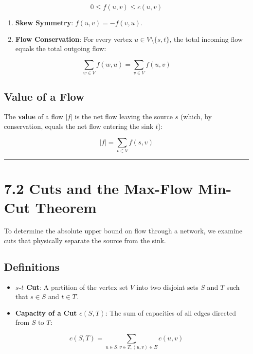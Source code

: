 \documentclass[
]{book}
\providecommand{\tightlist}{%
  \setlength{\itemsep}{0pt}\setlength{\parskip}{0pt}}
\theoremstyle{definition}
\theoremstyle{definition}
\theoremstyle{definition}
\theoremstyle{definition}
\theoremstyle{remark}
\begin{document}
\[0 \le f(u, v) \le c(u, v)\]

\begin{enumerate}
\def\labelenumi{\arabic{enumi}.}
\setcounter{enumi}{1}
\tightlist
\item
  \textbf{Skew Symmetry}: \(f(u, v) = -f(v, u)\).
\item
  \textbf{Flow Conservation}: For every vertex \(u \in V \setminus \{s, t\}\), the total incoming flow equals the total outgoing flow:
\end{enumerate}

\[\sum_{w \in V} f(w, u) = \sum_{v \in V} f(u, v)\]

\subsection{Value of a Flow}\label{value-of-a-flow}

The \textbf{value} of a flow \(\vert{}f\vert{}\) is the net flow leaving the source \(s\) (which, by conservation, equals the net flow entering the sink \(t\)):

\[\vert{}f\vert{} = \sum_{v \in V} f(s, v)\]

\begin{center}\rule{0.5\linewidth}{0.5pt}\end{center}

\section{7.2 Cuts and the Max-Flow Min-Cut Theorem}\label{cuts-and-the-max-flow-min-cut-theorem}

To determine the absolute upper bound on flow through a network, we examine cuts that physically separate the source from the sink.

\subsection{Definitions}\label{definitions-6}

\begin{itemize}
\tightlist
\item
  \textbf{\(s\)-\(t\) Cut}: A partition of the vertex set \(V\) into two disjoint sets \(S\) and \(T\) such that \(s \in S\) and \(t \in T\).
\item
  \textbf{Capacity of a Cut \(c(S, T)\)}: The sum of capacities of all edges directed from \(S\) to \(T\):
\end{itemize}

\[c(S, T) = \sum_{u \in S, v \in T, (u,v) \in E} c(u, v)\]
\end{document}
